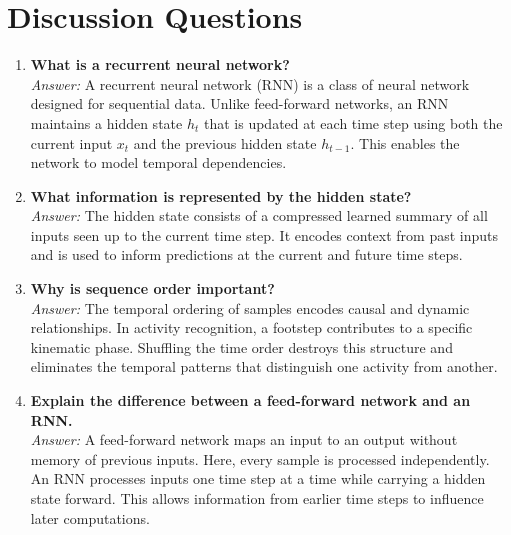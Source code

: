 \documentclass[10pt]{article}
\begin{document}
\section{Discussion Questions}

\begin{enumerate}

\item \textbf{What is a recurrent neural network?}\\
\textit{Answer:} A recurrent neural network (RNN) is a class of neural network designed for sequential data. Unlike feed-forward networks, an RNN maintains a hidden state $h_t$ that is updated at each time step using both the current input $x_t$ and the previous hidden state $h_{t-1}$. This enables the network to model temporal dependencies.\\
\vspace{8mm} 

\item \textbf{What information is represented by the hidden state?}\\
\textit{Answer:} The hidden state consists of a compressed learned summary of all inputs seen up to the current time step. It encodes context from past inputs and is used to inform predictions at the current and future time steps.\\
\vspace{8mm}

\item \textbf{Why is sequence order important?}\\
\textit{Answer:} The temporal ordering of samples encodes causal and dynamic relationships. In activity recognition, a footstep contributes to a specific kinematic phase. Shuffling the time order destroys this structure and eliminates the temporal patterns that distinguish one activity from another.\\
\vspace{8mm}

\item \textbf{Explain the difference between a feed-forward network and an RNN.}\\
\textit{Answer:} A feed-forward network maps an input to an output without memory of previous inputs. Here, every sample is processed independently. An RNN processes inputs one time step at a time while carrying a hidden state forward. This allows information from earlier time steps to influence later computations.\\
\vspace{8mm}


\end{enumerate}
\end{document}
